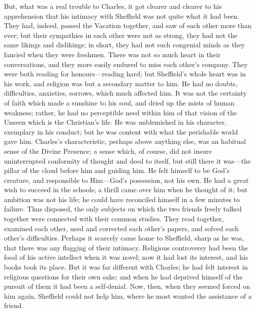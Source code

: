 But, what was a real trouble to Charles, it got clearer and clearer
to his apprehension that his intimacy with Sheffield was not quite
what it had been. They had, indeed, passed the Vacation together, and
saw of each other more than ever; but their sympathies in each other
were not as strong, they had not the same likings and dislikings; in
short, they had not such congenial minds as they fancied when they
were freshmen. There was not so much heart in their conversations, and
they more easily endured to miss each other's company. They were both
reading for honours—reading hard; but Sheffield's whole heart was in
his work, and religion was but a secondary matter to him. He had no
doubts, difficulties, anxieties, sorrows, which much affected him. It
was not the certainty of faith which made a sunshine to his soul, and
dried up the mists of human weakness; rather, he had no perceptible
need within him of that vision of the Unseen which is the Christian's
life. He was unblemished in his character, exemplary in his conduct;
but he was content with what the perishable world gave him. Charles's
characteristic, perhaps above anything else, was an habitual
sense of the Divine Presence; a sense which, of course, did not insure
uninterrupted conformity of thought and deed to itself, but still
there it was—the pillar of the cloud before him and guiding him. He
felt himself to be God's creature, and responsible to Him—God's
possession, not his own. He had a great wish to succeed in the
schools; a thrill came over him when he thought of it; but ambition
was not his life; he could have reconciled himself in a few minutes to
failure. Thus disposed, the only subjects on which the two friends
freely talked together were connected with their common studies. They
read together, examined each other, used and corrected each other's
papers, and solved each other's difficulties. Perhaps it scarcely came
home to Sheffield, sharp as he was, that there was any flagging of
their intimacy. Religious controversy had been the food of his active
intellect when it was novel; now it had lost its interest, and his
books took its place. But it was far different with Charles; he had
felt interest in religious questions for their own sake; and when he
had deprived himself of the pursuit of them it had been a self-denial.
Now, then, when they seemed forced on him again, Sheffield could not
help him, where he most wanted the assistance of a friend.

